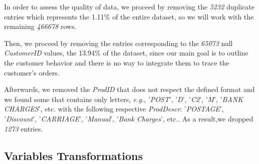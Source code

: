 In order to assess the quality of data, we proceed by removing the \emph{5232} duplicate entries which represents the 1.11\% of the entire dataset, so we will work with the remaining \emph{466678} rows.

Then, we proceed by removing the entries corresponding to the \emph{65073} null \emph{CustomerID} values, the 13.94\% of the dataset, since our main goal is to outline the customer behavior and there is no way to integrate them to trace the customer's orders.

Afterwards, we removed the \emph{ProdID} that does not respect the defined format and we found some that contains only letters, \emph{e.g.}, '\emph{POST}', '\emph{D}', '\emph{C2}', '\emph{M}', '\emph{BANK CHARGES}', etc. with the following respective \emph{ProdDescr}: '\emph{POSTAGE}', '\emph{Discount}', '\emph{CARRIAGE}', '\emph{Manual}', '\emph{Bank Charges}', etc.. As a result,we dropped \emph{1273} entries.

\subsection{Variables Transformations}

